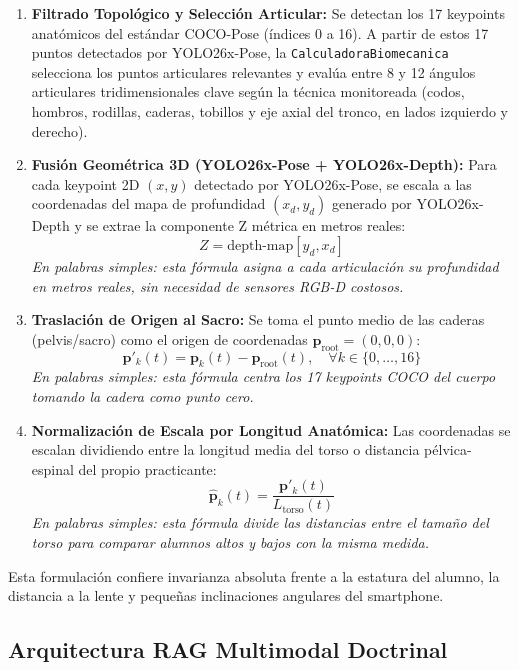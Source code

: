 \documentclass[12pt,letterpaper]{article}
\begin{document}
\begin{enumerate}
    \item \textbf{Filtrado Topológico y Selección Articular:} Se detectan los 17 keypoints anatómicos del estándar COCO-Pose (índices 0 a 16). A partir de estos 17 puntos detectados por YOLO26x-Pose, la \texttt{CalculadoraBiomecanica} selecciona los puntos articulares relevantes y evalúa entre 8 y 12 ángulos articulares tridimensionales clave según la técnica monitoreada (codos, hombros, rodillas, caderas, tobillos y eje axial del tronco, en lados izquierdo y derecho).

    \item \textbf{Fusión Geométrica 3D (YOLO26x-Pose + YOLO26x-Depth):} Para cada keypoint 2D $(x, y)$ detectado por YOLO26x-Pose, se escala a las coordenadas del mapa de profundidad $(x_d, y_d)$ generado por YOLO26x-Depth y se extrae la componente Z métrica en metros reales:
\[
Z = \text{depth-map}[y_d, x_d]
\]
\textit{En palabras simples: esta fórmula asigna a cada articulación su profundidad en metros reales, sin necesidad de sensores RGB-D costosos.}

    \item \textbf{Traslación de Origen al Sacro:} Se toma el punto medio de las caderas (pelvis/sacro) como el origen de coordenadas $\mathbf{p}_{\text{root}} = (0,0,0)$:
\[
\mathbf{p}'_{k}(t) = \mathbf{p}_{k}(t) - \mathbf{p}_{\text{root}}(t), \quad \forall k \in \{0, \dots, 16\}
\]
\textit{En palabras simples: esta fórmula centra los 17 keypoints COCO del cuerpo tomando la cadera como punto cero.}

    \item \textbf{Normalización de Escala por Longitud Anatómica:} Las coordenadas se escalan dividiendo entre la longitud media del torso o distancia pélvica-espinal del propio practicante:
\[
\mathbf{\hat{p}}_{k}(t) = \frac{\mathbf{p}'_{k}(t)}{L_{\text{torso}}(t)}
\]
\textit{En palabras simples: esta fórmula divide las distancias entre el tamaño del torso para comparar alumnos altos y bajos con la misma medida.}
\end{enumerate}

Esta formulación confiere invarianza absoluta frente a la estatura del alumno, la distancia a la lente y pequeñas inclinaciones angulares del smartphone.

\subsection{Arquitectura RAG Multimodal Doctrinal}
\end{document}
